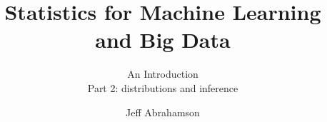 

\title
{Statistics for Machine Learning and Big Data}
\subtitle{An Introduction\\[6mm] Part 2: distributions and inference}

\author[Abrahamson] {Jeff Abrahamson}




\begin{frame}
  \titlepage
\end{frame}


